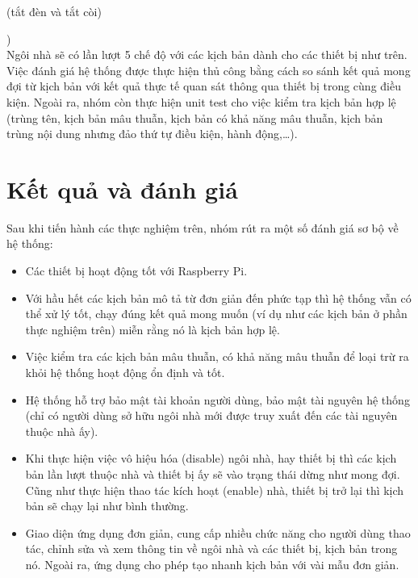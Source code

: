 \documentclass[12pt,a4paper,oneside]{extbook}
\begin{document}
\hspace{3cm}(tắt đèn và tắt còi)

\noindent\hspace{2cm} )\\

\noindent
Ngôi nhà sẽ có lần lượt 5 chế độ với các kịch bản dành cho các thiết bị như trên. Việc đánh giá hệ thống được thực hiện thủ công bằng cách so sánh kết quả mong đợi từ kịch bản với kết quả thực tế quan sát thông qua thiết bị trong cùng điều kiện. Ngoài ra, nhóm còn thực hiện unit test cho việc kiểm tra kịch bản hợp lệ (trùng tên, kịch bản mâu thuẫn, kịch bản có khả năng mâu thuẫn, kịch bản trùng nội dung nhưng đảo thứ tự điều kiện, hành động,\dots).

\section{Kết quả và đánh giá}

Sau khi tiến hành các thực nghiệm trên, nhóm rút ra một số đánh giá sơ bộ về hệ thống:

\begin{itemize}[topsep=1mm,itemsep=-0.5mm]
\item Các thiết bị hoạt động tốt với Raspberry Pi.
\item Với hầu hết các kịch bản mô tả từ đơn giản đến phức tạp thì hệ thống vẫn có thể xử lý tốt, chạy đúng kết quả mong muốn (ví dụ như các kịch bản ở phần thực nghiệm trên) miễn rằng nó là kịch bản hợp lệ.
\item Việc kiểm tra các kịch bản mâu thuẫn, có khả năng mâu thuẫn để loại trừ ra khỏi hệ thống hoạt động ổn định và tốt.
\item Hệ thống hỗ trợ bảo mật tài khoản người dùng, bảo mật tài nguyên hệ thống (chỉ có người dùng sở hữu ngôi nhà mới được truy xuất đến các tài nguyên thuộc nhà ấy).
\item Khi thực hiện việc vô hiệu hóa (disable) ngôi nhà, hay thiết bị thì các kịch bản lần lượt thuộc nhà và thiết bị ấy sẽ vào trạng thái dừng như mong đợi. Cũng như thực hiện thao tác kích hoạt (enable) nhà, thiết bị trở lại thì kịch bản sẽ chạy lại như bình thường.
\item Giao diện ứng dụng đơn giản, cung cấp nhiều chức năng cho người dùng thao tác, chỉnh sửa và xem thông tin về ngôi nhà và các thiết bị, kịch bản trong nó. Ngoài ra, ứng dụng cho phép tạo nhanh kịch bản với vài mẫu đơn giản.
\vspace{1mm}
\end{itemize}
\end{document}
